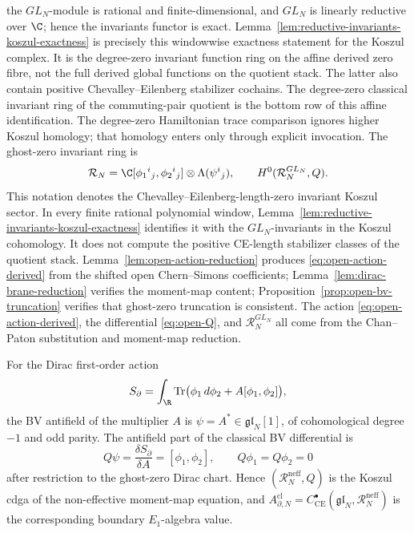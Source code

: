 \documentclass[11pt]{memoir}
\begin{document}
the \(GL_N\)-module is rational and finite-dimensional, and \(GL_N\) is
linearly reductive over \(\C\); hence the invariants functor is exact.
Lemma~\ref{lem:reductive-invariants-koszul-exactness} is precisely this
windowwise exactness statement for the Koszul complex.
It is the degree-zero invariant function ring on the affine derived
zero fibre, not the full derived global functions on the quotient
stack.  The latter also contain positive Chevalley--Eilenberg
stabilizer cochains.  The degree-zero classical invariant ring of the
commuting-pair quotient is the bottom row of this affine identification.
The degree-zero Hamiltonian trace comparison ignores higher Koszul
homology; that homology enters only through explicit invocation.  The
ghost-zero invariant ring is
\[
  \mathcal R_N
    =\C[\phi_1{}^i{}_j,\phi_2{}^i{}_j]\otimes\Lambda(\psi^i{}_j),
  \qquad
  H^0(\mathcal R_N^{GL_N},Q).
\]
This notation denotes the Chevalley--Eilenberg-length-zero invariant
Koszul sector.  In every finite rational polynomial window,
Lemma~\ref{lem:reductive-invariants-koszul-exactness} identifies it
with the \(GL_N\)-invariants in the Koszul cohomology.  It does not
compute the positive CE-length stabilizer classes of the quotient stack.
Lemma~\ref{lem:open-action-reduction} produces \eqref{eq:open-action-derived}
from the shifted open Chern--Simons coefficients;
Lemma~\ref{lem:dirac-brane-reduction} verifies the moment-map content;
Proposition~\ref{prop:open-bv-truncation} verifies that ghost-zero
truncation is consistent.  The action \eqref{eq:open-action-derived},
the differential \eqref{eq:open-Q}, and \(\mathcal R_N^{GL_N}\) all
come from the Chan--Paton substitution and moment-map reduction.

\begin{lem}\label{lem:bv-origin-open-koszul-differential}
  For the Dirac first-order action
  \[
    S_\partial
      =\int_\R\operatorname{Tr}\bigl(\phi_1\,d\phi_2
        +A[\phi_1,\phi_2]\bigr),
  \]
  the BV antifield of the multiplier \(A\) is
  \(\psi=A^*\in\mathfrak{gl}_N[1]\), of cohomological degree \(-1\)
  and odd parity.  The antifield part of the classical BV differential is
  \[
    Q\psi=\frac{\delta S_\partial}{\delta A}=[\phi_1,\phi_2],
    \qquad Q\phi_1=Q\phi_2=0
  \]
  after restriction to the ghost-zero Dirac chart.  Hence
  \((\mathcal R_N^{\mathrm{neff}},Q)\) is the Koszul cdga of the
  non-effective moment-map equation, and
  \(A^{\mathrm{cl}}_{\partial,N}
    =C^\bullet_{\mathrm{CE}}(\mathfrak{gl}_N,\mathcal R_N^{\mathrm{neff}})\)
  is the corresponding boundary \(E_1\)-algebra value.
\end{lem}
\end{document}
